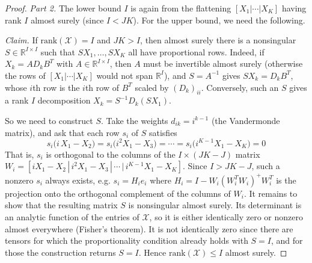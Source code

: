   \begin{proof}
    \textit{Part 2.} The lower bound $I$ is again from the flattening $[X_1 | \cdots | X_K]$ having rank $I$ almost surely (since $I < JK$). For the upper bound, we need the following.

    \textit{Claim.} If $\mathrm{rank}(\mathcal{X}) = I$ and $JK > I$, then almost surely there is a nonsingular $S \in \mathbb{R}^{I \times I}$ such that $S X_1, \ldots, S X_K$ all have proportional rows. Indeed, if $X_k = A D_k B^T$ with $A \in \mathbb{R}^{I \times I}$, then $A$ must be invertible almost surely (otherwise the rows of $[X_1 | \cdots | X_K]$ would not span $\mathbb{R}^I$), and $S = A^{-1}$ gives $S X_k = D_k B^T$, whose $i$th row is the $i$th row of $B^T$ scaled by $(D_k)_{ii}$. Conversely, such an $S$ gives a rank $I$ decomposition $X_k = S^{-1} D_k (S X_1)$.

    So we need to construct $S$. Take the weights $d_{ik} = i^{k-1}$ (the Vandermonde matrix), and ask that each row $s_i$ of $S$ satisfies
    \begin{equation}
      s_i \big( i \, X_1 - X_2 \big) = s_i \big( i^2 X_1 - X_3 \big) = \cdots = s_i \big( i^{K-1} X_1 - X_K \big) = 0
    \end{equation}
    That is, $s_i$ is orthogonal to the columns of the $I \times (JK - J)$ matrix $W_i = [i X_1 - X_2 \,|\, i^2 X_1 - X_3 \,|\, \cdots \,|\, i^{K-1} X_1 - X_K]$. Since $I > JK - J$, such a nonzero $s_i$ always exists, e.g. $s_i = H_i e_i$ where $H_i = I - W_i (W_i^T W_i)^+ W_i^T$ is the projection onto the orthogonal complement of the columns of $W_i$. It remains to show that the resulting matrix $S$ is nonsingular almost surely. Its determinant is an analytic function of the entries of $\mathcal{X}$, so it is either identically zero or nonzero almost everywhere (Fisher's theorem). It is not identically zero since there are tensors for which the proportionality condition already holds with $S = I$, and for those the construction returns $S = I$. Hence $\mathrm{rank}(\mathcal{X}) \leq I$ almost surely.
  \end{proof}

